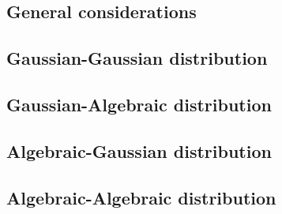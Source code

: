 \subsection{General considerations}\label{subsec:general_considerations}



\subsection{Gaussian-Gaussian distribution}\label{subsec:gaussian_gaussian}

\subsection{Gaussian-Algebraic distribution}\label{subsec:gaussian_algebraic}

\subsection{Algebraic-Gaussian distribution}\label{subsec:algebraic_gaussian}

\subsection{Algebraic-Algebraic distribution}\label{subsec:algebraic_algebraic}

